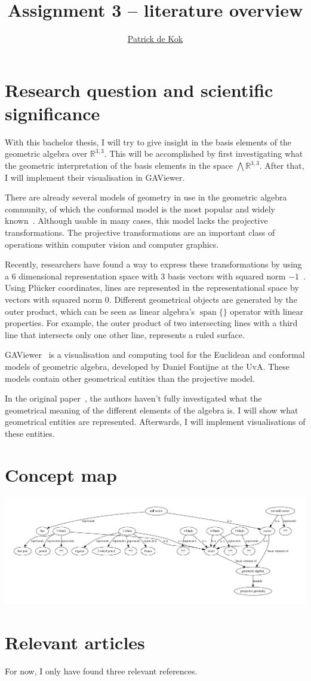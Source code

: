 \documentclass[a4paper,11pt,twoside]{article}
\title{Assignment 3 -- literature overview}
\author{\href{mailto:pkok@science.uva.nl}{Patrick de Kok}}
\newcommand{\RL}{\ensuremath{\mathbb{R}^{3,3}}}
\begin{document}
\maketitle
\section{Research question and scientific significance}
With this bachelor thesis, I will try to give insight in the basis elements of the geometric algebra over $\RL$.  This will be accomplished by first investigating what the geometric interpretation of the basis elements in the space $\bigwedge \RL$.  After that, I will implement their visualisation in GAViewer.  

There are already several models of geometry in use in the geometric algebra community, of which the conformal model is the most popular and widely known~\cite{TheBook}.  Although usable in many cases, this model lacks the projective transformations.  The projective transformations are an important class of operations within computer vision and computer graphics.

Recently, researchers have found a way to express these transformations by using a 6 dimensional representation space with 3 basis vectors with squared norm $-1$~\cite{Hongbo}.  Using Pl\"ucker coordinates, lines are represented in the representational space by vectors with squared norm 0.  Different geometrical objects are generated by the outer product, which can be seen as linear algebra's $\operatorname{span}\{\}$ operator with linear properties.  For example, the outer product of two intersecting lines with a third line that intersects only one other line, represents a ruled surface.

GAViewer~\cite{GAViewer} is a visualisation and computing tool for the Euclidean and conformal models of geometric algebra, developed by Daniel Fontijne at the UvA.  These models contain other geometrical entities than the projective model.

In the original paper~\cite{Hongbo}, the authors haven't fully investigated what the geometrical meaning of the different elements of the algebra is.  I will show what geometrical entities are represented.  Afterwards, I will implement visualisations of these entities.

\section{Concept map}
\includegraphics[width=1.0\textwidth]{conceptmap.pdf}

\section{Relevant articles}
For now, I only have found three relevant references.

{}

\end{document}
